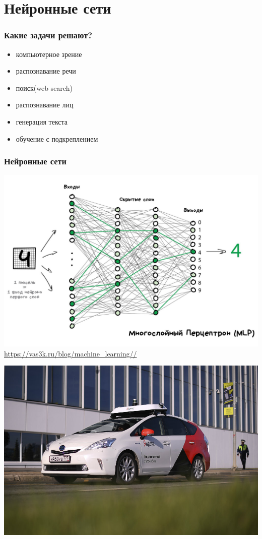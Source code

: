 \documentclass[aspectratio=169,newPxFont]{beamer}
\begin{document}
\section{Нейронные сети}

\begin{frame}
	\frametitle{Какие задачи решают?}
	\begin{itemize}
		\item компьютерное зрение
		\item распознавание речи
		\item поиск(web search)
		\item распознавание лиц
		\item генерация текста
		\item обучение с подкреплением
	\end{itemize}
\end{frame}

\begin{frame}
\frametitle{Нейронные сети}
\centering \includegraphics[width=0.6\linewidth]{nn_4.jpg}\\
{\url{https://vas3k.ru/blog/machine_learning//}}
\end{frame}

\begin{frame}{}
	\centering \includegraphics[width=0.7\linewidth]{yandex.jpg}\\
\end{frame}
\end{document}
